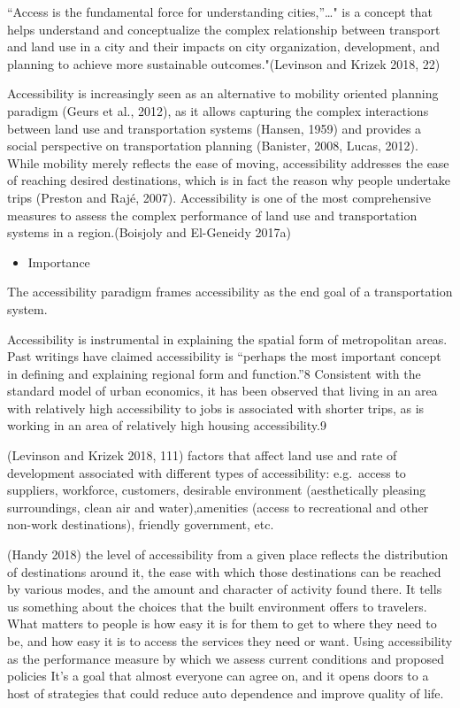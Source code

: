 \documentclass[12pt,]{article}
\providecommand{\tightlist}{%
  \setlength{\itemsep}{0pt}\setlength{\parskip}{0pt}}
\begin{document}
``Access is the fundamental force for understanding cities,''\ldots{}"
is a concept that helps understand and conceptualize the complex
relationship between transport and land use in a city and their impacts
on city organization, development, and planning to achieve more
sustainable outcomes."(Levinson and Krizek 2018, 22)

Accessibility is increasingly seen as an alternative to mobility
oriented planning paradigm (Geurs et al., 2012), as it allows capturing
the complex interactions between land use and transportation systems
(Hansen, 1959) and provides a social perspective on transportation
planning (Banister, 2008, Lucas, 2012). While mobility merely reflects
the ease of moving, accessibility addresses the ease of reaching desired
destinations, which is in fact the reason why people undertake trips
(Preston and Rajé, 2007). Accessibility is one of the most comprehensive
measures to assess the complex performance of land use and
transportation systems in a region.(Boisjoly and El-Geneidy 2017a)

\begin{itemize}
\tightlist
\item
  Importance
\end{itemize}

The accessibility paradigm frames accessibility as the end goal of a
transportation system.

Accessibility is instrumental in explaining the spatial form of
metropolitan areas. Past writings have claimed accessibility is
``perhaps the most important concept in defining and explaining regional
form and function.''8 Consistent with the standard model of urban
economics, it has been observed that living in an area with relatively
high accessibility to jobs is associated with shorter trips, as is
working in an area of relatively high housing accessibility.9

(Levinson and Krizek 2018, 111) factors that affect land use and rate of
development associated with different types of accessibility:
e.g.~access to suppliers, workforce, customers, desirable environment
(aesthetically pleasing surroundings, clean air and water),amenities
(access to recreational and other non-work destinations), friendly
government, etc.

(Handy 2018) the level of accessibility from a given place reflects the
distribution of destinations around it, the ease with which those
destinations can be reached by various modes, and the amount and
character of activity found there. It tells us something about the
choices that the built environment offers to travelers. What matters to
people is how easy it is for them to get to where they need to be, and
how easy it is to access the services they need or want. Using
accessibility as the performance measure by which we assess current
conditions and proposed policies It's a goal that almost everyone can
agree on, and it opens doors to a host of strategies that could reduce
auto dependence and improve quality of life.
\end{document}
